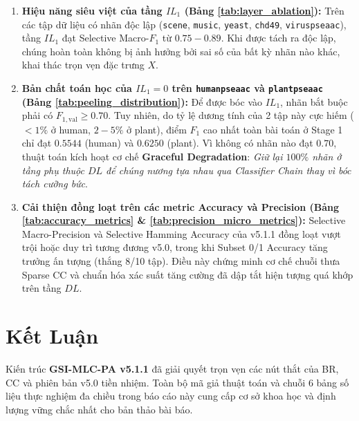 \documentclass[11pt,a4paper]{article}
\begin{document}
\begin{enumerate}
    \item \textbf{Hiệu năng siêu việt của tầng $IL_1$ (Bảng \ref{tab:layer_ablation}):}
    Trên các tập dữ liệu có nhãn độc lập (\texttt{scene}, \texttt{music}, \texttt{yeast}, \texttt{chd49}, \texttt{viruspseaac}), tầng $IL_1$ đạt Selective Macro-$F_1$ từ $\mathbf{0.75 - 0.89}$. Khi được tách ra độc lập, chúng hoàn toàn không bị ảnh hưởng bởi sai số của bất kỳ nhãn nào khác, khai thác trọn vẹn đặc trưng $X$.
    
    \item \textbf{Bản chất toán học của $IL_1 = 0$ trên \texttt{humanpseaac} và \texttt{plantpseaac} (Bảng \ref{tab:peeling_distribution}):}
    Để được bóc vào $IL_1$, nhãn bắt buộc phải có $F_{1, \text{val}} \ge 0.70$. Tuy nhiên, do tỷ lệ dương tính của 2 tập này cực hiếm ($< 1\%$ ở human, $2-5\%$ ở plant), điểm $F_1$ cao nhất toàn bài toán ở Stage 1 chỉ đạt $\mathbf{0.5544}$ (human) và $\mathbf{0.6250}$ (plant). Vì không có nhãn nào đạt $0.70$, thuật toán kích hoạt cơ chế \textbf{Graceful Degradation}: \textit{Giữ lại $100\%$ nhãn ở tầng phụ thuộc $DL$ để chúng nương tựa nhau qua Classifier Chain thay vì bóc tách cưỡng bức}.
    
    \item \textbf{Cải thiện đồng loạt trên các metric Accuracy và Precision (Bảng \ref{tab:accuracy_metrics} \& \ref{tab:precision_micro_metrics}):}
    Selective Macro-Precision và Selective Hamming Accuracy của v5.1.1 đồng loạt vượt trội hoặc duy trì tương đương v5.0, trong khi Subset 0/1 Accuracy tăng trưởng ấn tượng (thắng 8/10 tập). Điều này chứng minh cơ chế chuỗi thưa Sparse CC và chuẩn hóa xác suất tăng cường đã dập tắt hiện tượng quá khớp trên tầng $DL$.
\end{enumerate}

\section{Kết Luận}
Kiến trúc \textbf{GSI-MLC-PA v5.1.1} đã giải quyết trọn vẹn các nút thắt của BR, CC và phiên bản v5.0 tiền nhiệm. Toàn bộ mã giả thuật toán và chuỗi 6 bảng số liệu thực nghiệm đa chiều trong báo cáo này cung cấp cơ sở khoa học và định lượng vững chắc nhất cho bản thảo bài báo.
\end{document}
